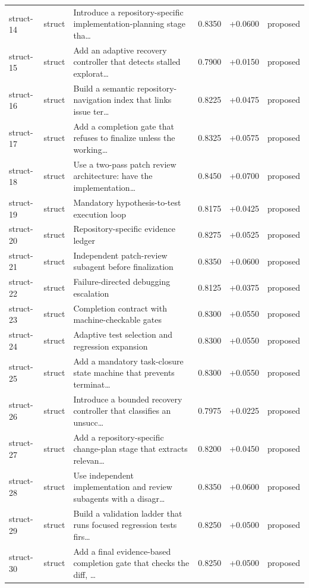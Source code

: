 \begin{center}
\begin{longtable}{llp{5.2cm}rrl}
struct-14 & struct & Introduce a repository-specific implementation-planning stage tha\ldots{} & 0.8350 & +0.0600 & proposed \\
struct-15 & struct & Add an adaptive recovery controller that detects stalled explorat\ldots{} & 0.7900 & +0.0150 & proposed \\
struct-16 & struct & Build a semantic repository-navigation index that links issue ter\ldots{} & 0.8225 & +0.0475 & proposed \\
struct-17 & struct & Add a completion gate that refuses to finalize unless the working\ldots{} & 0.8325 & +0.0575 & proposed \\
struct-18 & struct & Use a two-pass patch review architecture: have the implementation\ldots{} & 0.8450 & +0.0700 & proposed \\
struct-19 & struct & Mandatory hypothesis-to-test execution loop & 0.8175 & +0.0425 & proposed \\
struct-20 & struct & Repository-specific evidence ledger & 0.8275 & +0.0525 & proposed \\
struct-21 & struct & Independent patch-review subagent before finalization & 0.8350 & +0.0600 & proposed \\
struct-22 & struct & Failure-directed debugging escalation & 0.8125 & +0.0375 & proposed \\
struct-23 & struct & Completion contract with machine-checkable gates & 0.8300 & +0.0550 & proposed \\
struct-24 & struct & Adaptive test selection and regression expansion & 0.8300 & +0.0550 & proposed \\
struct-25 & struct & Add a mandatory task-closure state machine that prevents terminat\ldots{} & 0.8300 & +0.0550 & proposed \\
struct-26 & struct & Introduce a bounded recovery controller that classifies an unsucc\ldots{} & 0.7975 & +0.0225 & proposed \\
struct-27 & struct & Add a repository-specific change-plan stage that extracts relevan\ldots{} & 0.8200 & +0.0450 & proposed \\
struct-28 & struct & Use independent implementation and review subagents with a disagr\ldots{} & 0.8350 & +0.0600 & proposed \\
struct-29 & struct & Build a validation ladder that runs focused regression tests firs\ldots{} & 0.8250 & +0.0500 & proposed \\
struct-30 & struct & Add a final evidence-based completion gate that checks the diff, \ldots{} & 0.8250 & +0.0500 & proposed \\

\end{longtable}
\end{center}
